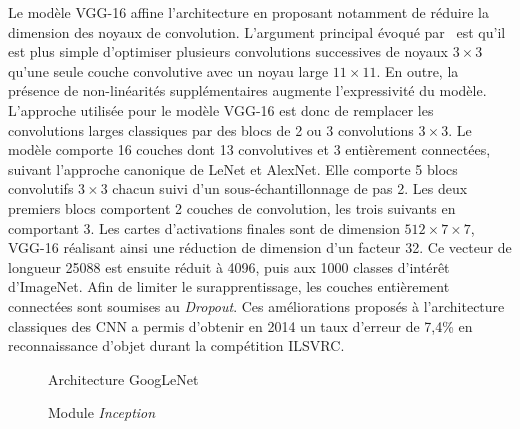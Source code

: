 Le modèle VGG-16 affine l'architecture en proposant notamment de réduire la dimension des noyaux de convolution. L'argument principal évoqué par~\cite{chatfield_return_2014,simonyan_very_2014} est qu'il est plus simple d'optimiser plusieurs convolutions successives de noyaux $3\times3$ qu'une seule couche convolutive avec un noyau large $11\times11$. En outre, la présence de non-linéarités supplémentaires augmente l'expressivité du modèle. L'approche utilisée pour le modèle VGG-16 est donc de remplacer les convolutions larges classiques par des blocs de 2 ou 3 convolutions $3\times3$. Le modèle comporte 16 couches dont 13 convolutives et 3 entièrement connectées, suivant l'approche canonique de LeNet et AlexNet. Elle comporte 5 blocs convolutifs $3\times3$ chacun suivi d'un sous-échantillonnage de pas 2. Les deux premiers blocs comportent 2 couches de convolution, les trois suivants en comportant 3. Les cartes d'activations finales sont de dimension $512\times7\times7$, VGG-16 réalisant ainsi une réduction de dimension d'un facteur 32. Ce vecteur de longueur 25088 est ensuite réduit à 4096, puis aux 1000 classes d'intérêt d'ImageNet. Afin de limiter le surapprentissage, les couches entièrement connectées sont soumises au \emph{Dropout}. Ces améliorations proposés à l'architecture classiques des \gls{CNN} a permis d'obtenir en 2014 un taux d'erreur de 7,4\% en reconnaissance d'objet durant la compétition \gls{ILSVRC}.


\begin{figure}[t]
  \resizebox{\textwidth}{!}{
    
  }
  \caption{Architecture GoogLeNet~\cite{szegedy_going_2015}}
  \label{fig:googlenet}
\end{figure}

\begin{figure}[t]
  \resizebox{0.5\textwidth}{!}{
    
  }
  \caption{Module \emph{Inception}~\cite{szegedy_going_2015}}
  \label{fig:inception}
\end{figure}

